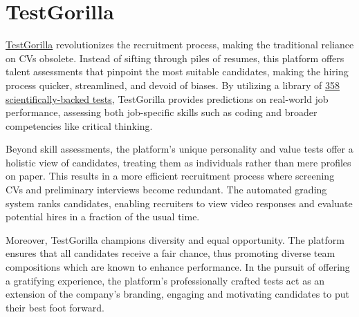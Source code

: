 \documentclass[
]{book}
\begin{document}
\hypertarget{testgorilla}{%
\section{TestGorilla}\label{testgorilla}}

\href{https://www.testgorilla.com/?utm_term=testgorilla\&utm_campaign=TestGorilla+\%7C+Branded+I+SKAG+AdGroups+\%7C+US\&utm_source=google\&utm_medium=cpc\&hsa_acc=4932434860\&hsa_cam=12598017525\&hsa_grp=118410898783\&hsa_ad=537212466646\&hsa_src=g\&hsa_tgt=kwd-927907651583\&hsa_kw=testgorilla\&hsa_mt=e\&hsa_net=adwords\&hsa_ver=3\&gclid=CjwKCAjw5_GmBhBIEiwA5QSMxLAMrdiiKyGt8ZjFz4BL_vP1ktTPpNCugXM2c48T20vqlbD_7lhF1hoCWDEQAvD_BwE}{TestGorilla} revolutionizes the recruitment process, making the traditional reliance on CVs obsolete. Instead of sifting through piles of resumes, this platform offers talent assessments that pinpoint the most suitable candidates, making the hiring process quicker, streamlined, and devoid of biases. By utilizing a library of \href{https://www.testgorilla.com/?utm_term=testgorilla\&utm_campaign=TestGorilla+\%7C+Branded+I+SKAG+AdGroups+\%7C+US\&utm_source=google\&utm_medium=cpc\&hsa_acc=4932434860\&hsa_cam=12598017525\&hsa_grp=118410898783\&hsa_ad=537212466646\&hsa_src=g\&hsa_tgt=kwd-927907651583\&hsa_kw=testgorilla\&hsa_mt=e\&hsa_net=adwords\&hsa_ver=3\&gclid=CjwKCAjw5_GmBhBIEiwA5QSMxLAMrdiiKyGt8ZjFz4BL_vP1ktTPpNCugXM2c48T20vqlbD_7lhF1hoCWDEQAvD_BwE}{358 scientifically-backed tests}, TestGorilla provides predictions on real-world job performance, assessing both job-specific skills such as coding and broader competencies like critical thinking.

Beyond skill assessments, the platform's unique personality and value tests offer a holistic view of candidates, treating them as individuals rather than mere profiles on paper. This results in a more efficient recruitment process where screening CVs and preliminary interviews become redundant. The automated grading system ranks candidates, enabling recruiters to view video responses and evaluate potential hires in a fraction of the usual time.

Moreover, TestGorilla champions diversity and equal opportunity. The platform ensures that all candidates receive a fair chance, thus promoting diverse team compositions which are known to enhance performance. In the pursuit of offering a gratifying experience, the platform's professionally crafted tests act as an extension of the company's branding, engaging and motivating candidates to put their best foot forward.
\end{document}
